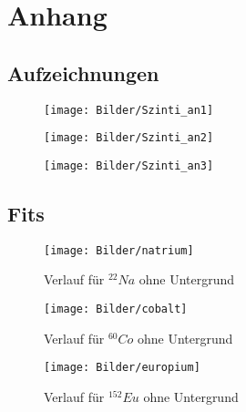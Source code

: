 \clearpage
\section{Anhang}
\subsection{Aufzeichnungen}
\begin{figure}[h]
\begin{center}
\texttt{[image: Bilder/Szinti\_an1]}
\end{center}
\end{figure}
\begin{figure}[h]
\begin{center}
\texttt{[image: Bilder/Szinti\_an2]}
\end{center}
\end{figure}
\begin{figure}[h]
\begin{center}
\texttt{[image: Bilder/Szinti\_an3]}
\end{center}
\end{figure}
\clearpage
\subsection{Fits}
\begin{figure}[h]
\begin{center}
\texttt{[image: Bilder/natrium]}
\caption{Verlauf für $^{22}Na$ ohne Untergrund}
\end{center}
\end{figure}
\begin{figure}[h]
\begin{center}
\texttt{[image: Bilder/cobalt]}
\caption{Verlauf für $^{60}Co$ ohne Untergrund}
\end{center}
\end{figure}
\begin{figure}[h]
\begin{center}
\texttt{[image: Bilder/europium]}
\caption{Verlauf für $^{152}Eu$ ohne Untergrund}
\end{center}
\end{figure}